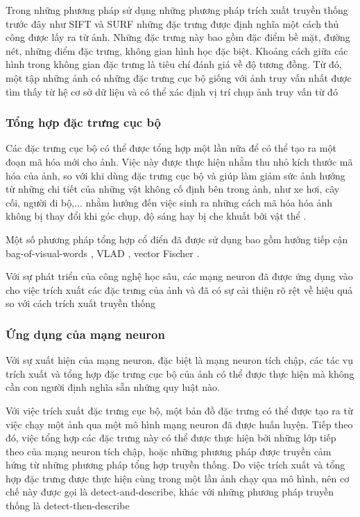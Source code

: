 Trong những phương pháp sử dụng những phương pháp trích xuất truyền thống trước đây như SIFT \cite{lowe2004distinctive} và SURF \cite{bay2006surf} những đặc trưng được định nghĩa một cách thủ công được lấy ra từ ảnh. Những đặc trưng này bao gồm đặc điểm bề mặt, đường nét, những điểm đặc trưng, không gian hình học đặc biệt. Khoảng cách giữa các hình trong không gian đặc trưng là tiêu chí đánh giá về độ tương đồng. Từ đó, một tập những ảnh có những đặc trưng cục bộ giống với ảnh truy vấn nhất được tìm thấy từ hệ cơ sở dữ liệu và có thể xác định vị trí chụp ảnh truy vấn từ đó \cite{pion2020benchmarking}
\subsubsection*{Tổng hợp đặc trưng cục bộ}
Các đặc trưng cục bộ có thể được tổng hợp một lần nữa để có thể tạo ra một đoạn mã hóa mới cho ảnh. Việc này được thực hiện nhằm thu nhỏ kích thước mã hóa của ảnh, so với khi dùng đặc trưng cục bộ và giúp làm giảm sức ảnh hưởng từ những chi tiết của những vật không cố định bên trong ảnh, như xe hơi, cây cối, người đi bộ,... nhằm hướng đến việc sinh ra những cách mã hóa hóa ảnh không bị thay đổi khi góc chụp, độ sáng hay bị che khuất bởi vật thể \cite{jegou2010aggregating}.

Một số phương pháp tổng hợp cổ điển đã được sử dụng bao gồm hướng tiếp cận bag-of-visual-words \cite{philbin2007object}, VLAD \cite{jegou2010aggregating}, vector Fischer \cite{jegou2011aggregating}.

Với sự phát triển của công nghệ học sâu, các mạng neuron đã được ứng dụng vào cho việc trích xuất các đặc trưng của ảnh và đã có sự cải thiện rõ rệt về hiệu quả \cite{sunderhauf2015performance} so với cách trích xuất truyền thống
\subsubsection*{Ứng dụng của mạng neuron}

Với sự xuất hiện của mạng neuron, đặc biệt là mạng neuron tích chập, các tác vụ trích xuất và tổng hợp đặc trưng cục bộ của ảnh có thể được thực hiện mà không cần con người định nghĩa sẵn những quy luật nào.

Với việc trích xuất đặc trưng cục bộ, một bản đồ đặc trưng có thể được tạo ra từ việc chạy một ảnh qua một mô hình mạng neuron đã được huấn luyện. Tiếp theo đó, việc tổng hợp các đặc trưng này có thể được thực hiện bởi những lớp tiếp theo của mạng neuron tích chập, hoặc những phương pháp được truyền cảm hứng từ những phương pháp tổng hợp truyền thống. Do việc trích xuất và tổng hợp đặc trưng được thực hiện cùng trong một lần ảnh chạy qua mô hình, nên cơ chế này được gọi là detect-and-describe, khác với những phương pháp truyền thống là detect-then-describe \cite{9373578}

